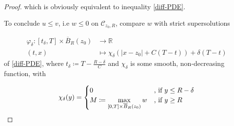 \begin{theorem}
\begin{proof}
				which is obviously equivalent to inequality \eqref{diff-PDE}.
				
				To conclude $ u \leq v $, i.e $ w \leq 0 $ on $ \mathcal{C}_{z_0, R} $, compare $ w $ with strict supersolutions 
				
				\begin{align*}
				\varphi_{\delta} : \left[ t_{\delta}, T \right] \times \overline{B}_R (z_0) &\to \mathbb{R} \\
				(t, x) &\mapsto \chi_{\delta} \left( \lvert x - z_0 \rvert + C(T - t) \right) + \delta (T - t)
				\end{align*}
				of \eqref{diff-PDE}, where $ t_{\delta} \coloneqq T - \frac{R - \delta}{C} $ and $ \chi_{\delta} $ is some smooth, non-decreasing function, with
				
				\begin{align*}
					\chi_{\delta}(y) = \begin{cases}
					0 &\hbox{, if } y \leq R - \delta \\
					M \coloneqq \max\limits_{\left[0, T\right] \times \overline{B}_R (z_0)} w &\hbox{, if }y \geq R
					\end{cases}
				\end{align*}
				

\end{proof}
\end{theorem}
